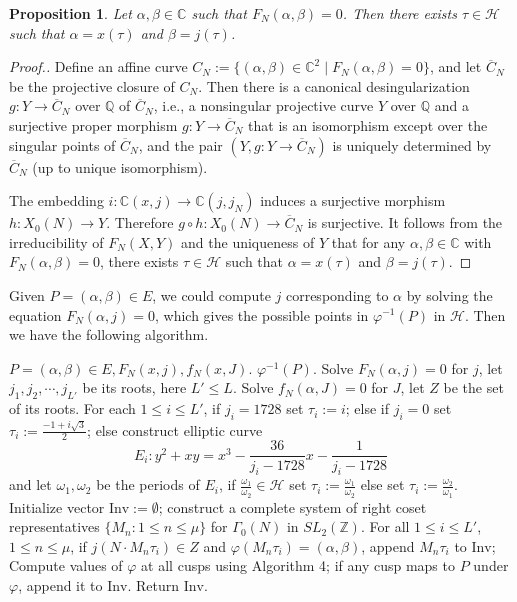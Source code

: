 \documentclass[10pt, a4paper]{article}
\newtheorem{proposition}[theorem]{Proposition}
\begin{document}
\begin{proposition}
Let  $\alpha, \beta \in \mathbb{C}$ such that  $F_N(\alpha, \beta) = 0$.  Then there exists $\tau \in \mathcal{H}$ such that $\alpha = x(\tau)$ and $\beta = j(\tau)$.
\end{proposition}
\begin{proof}[Proof.]
Define an affine curve
$C_N := \{ (\alpha, \beta) \in \mathbb{C}^2 \mid F_N(\alpha, \beta) = 0 \}$,
and let $\overline{C}_N$ be the projective closure of $C_N$.
Then  there is a canonical desingularization  $g: Y \to \overline{C}_N$ over  $\mathbb{Q}$ of $\overline{C}_N$, i.e.,   a   nonsingular projective  curve $Y$ over $\mathbb{Q}$ and  a surjective proper morphism
$g: Y \to \overline{C}_N$ that is an isomorphism except over the singular points of $\overline{C}_N$, and the
pair $(Y, g: Y \to \overline{C}_N)$  is uniquely determined by $\overline{C}_N$ (up to unique isomorphism).

 The embedding $i: \mathbb{C}(x, j) \to \mathbb{C}(j, j_N)$ induces a surjective morphism
$h: X_0(N) \to Y.$ Therefore  $g\circ h: X_0(N) \to \overline{C}_N$ is surjective.  It follows from the  irreducibility of $F_N(X,Y)$ and the uniqueness of $Y$ that for any $\alpha, \beta \in \mathbb{C}$ with $F_N(\alpha, \beta) = 0$, there exists $\tau \in \mathcal{H}$ such that $\alpha = x(\tau)$ and $\beta =j(\tau)$.
\end{proof}
Given $P=(\alpha, \beta) \in E$, we could compute $j$ corresponding to $\alpha$ by solving  the equation $F_N(\alpha, j) = 0$,  which gives  the possible points  in  $\varphi^{-1}(P)$ in $\mathcal{H}$. Then we have  the following algorithm.
\begin{algorithm}[H]
\caption{Algorithm for computing  the fibers  of $\varphi$}
\begin{algorithmic}[1]
\REQUIRE  $P=(\alpha, \beta) \in E,F_N(x, j),f_N(x, J).$
\ENSURE  $\varphi^{-1}(P)$.
\STATE  Solve $F_N(\alpha, j) = 0$  for $j$,  let $j_1, j_2, \cdots, j_{L'}$   be its  roots,  here  $L' \leq L$.
 \STATE  Solve $f_N(\alpha, J) = 0$ for $J$,  let $Z$ be  the set of  its roots.
\STATE  For each { $1 \leq i \leq L'$},
 if {$j_i = 1728$} set $\tau_i := i$;
else if {$j_i = 0$} set  $\tau_i := \frac{-1 + i\sqrt{3}}{2}$;
else construct elliptic curve
    \[ E_i : y^2 + xy = x^3 - \frac{36}{j_i - 1728}x - \frac{1}{j_i - 1728} \]
and let $\omega_1, \omega_2$ be the periods of $E_i$,
    if {$\frac{\omega_1}{\omega_2} \in \mathcal{H}$}
        set $\tau_i := \frac{\omega_1}{\omega_2}$
    else set $\tau_i := \frac{\omega_2}{\omega_1}$.
\STATE Initialize  vector $\text{Inv}:= \emptyset$;
construct a complete system of right coset representatives $\{M_n : 1 \leq n \leq \mu\}$ for $\Gamma_0(N)$ in $SL_2(\mathbb{Z})$.
\STATE  For all { $1 \leq i \leq L'$}, { $1 \leq n \leq \mu$},   if $j(N\cdot M_n\tau_i) \in Z$ and  $\varphi(M_n\tau_i) = (\alpha, \beta)$, append $M_n\tau_i$ to $\text{Inv}$;
\STATE Compute values of $\varphi$ at all cusps using Algorithm 4;  if any cusp maps to $P$ under $\varphi$, append it to $\text{Inv}$.
\STATE  Return $\text{Inv}$.
\end{algorithmic}
\end{algorithm}
\end{document}

